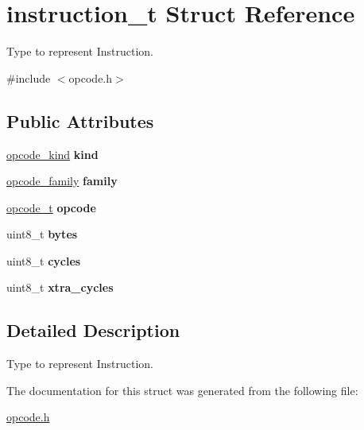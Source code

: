 \hypertarget{structinstruction__t}{}\section{instruction\+\_\+t Struct Reference}
\label{structinstruction__t}


Type to represent Instruction.  




{\ttfamily \#include $<$opcode.\+h$>$}

\subsection*{Public Attributes}
\begin{DoxyCompactItemize}
\item 
\mbox{\label{structinstruction__t_a1f89c8540f55e1e12d388acc925e9bd6}} 
\hyperlink{opcode_8h_aee17c6feee6606868ad9a141b66553f7}{opcode\+\_\+kind} {\bfseries kind}
\item 
\mbox{\label{structinstruction__t_a20549cbd22b19456c56f0e8d01b87b1b}} 
\hyperlink{opcode_8h_aab866c9e3c259061f48369dbe6d98efe}{opcode\+\_\+family} {\bfseries family}
\item 
\mbox{\label{structinstruction__t_a281cfabd9c19f07edf2473072db66a62}} 
\hyperlink{opcode_8h_acf7fa5c1985986fc6eeb0f6dd03b0326}{opcode\+\_\+t} {\bfseries opcode}
\item 
\mbox{\label{structinstruction__t_a01fd5a203acb200642656c67dd460956}} 
uint8\+\_\+t {\bfseries bytes}
\item 
\mbox{\label{structinstruction__t_a7543ef42525ed12ef461ba8543fedfb5}} 
uint8\+\_\+t {\bfseries cycles}
\item 
\mbox{\label{structinstruction__t_a80aaa119bc33c7efaa4e74ca5a1b93d4}} 
uint8\+\_\+t {\bfseries xtra\+\_\+cycles}
\end{DoxyCompactItemize}


\subsection{Detailed Description}
Type to represent Instruction. 

The documentation for this struct was generated from the following file\+:\begin{DoxyCompactItemize}
\item 
\hyperlink{opcode_8h}{opcode.\+h}\end{DoxyCompactItemize}
